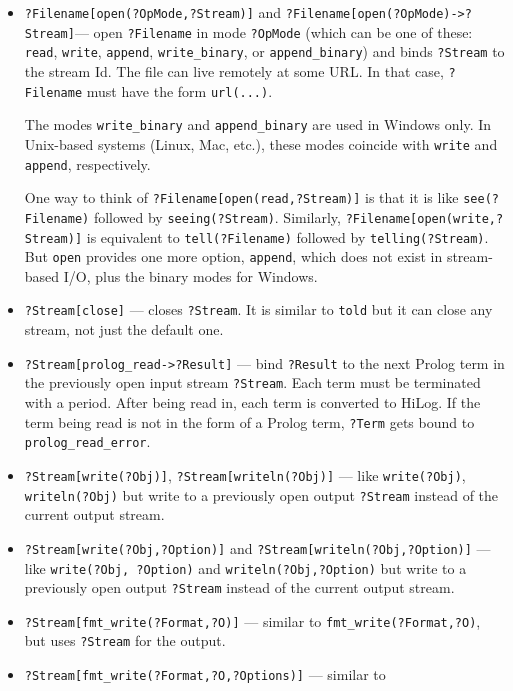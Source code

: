 \documentclass[11pt]{article}
\begin{document}
\begin{itemize}
\item  {\tt ?Filename[open(?OpMode,?Stream)]} and
  \texttt{?Filename[open(?OpMode)->?Stream]}--- open {\tt ?Filename} in mode
  {\tt ?OpMode} (which can be one of these: {\tt read}, {\tt write}, {\tt append},
  \texttt{write\_binary}, or \texttt{append\_binary}) and
  binds {\tt ?Stream} to the stream Id.
  The file can live remotely at some URL. In that case, {\tt ?Filename}
  must have the form {\tt url(...)}.  

  The modes \texttt{write\_binary} and \texttt{append\_binary} are used in
  Windows only. In Unix-based systems (Linux, Mac, etc.), these modes
  coincide with {\tt write} and {\tt append}, respectively.

  One way to think of 
  \texttt{?Filename[open(read,?Stream)]} is that it is
  like \texttt{see(?Filename)}
  followed by \texttt{seeing(?Stream)}. Similarly,
  \texttt{?Filename[open(write,?Stream)]} 
  is equivalent to \texttt{tell(?Filename)} followed by \texttt{telling(?Stream)}.
  But \texttt{open} provides one more option, \texttt{append}, which does not
  exist in stream-based I/O, plus the binary modes for Windows.
\item {\tt ?Stream[close]} --- closes {\tt ?Stream}. It is similar to
  \texttt{told} but it can close any stream, not just the default one. 
\item {\tt ?Stream[prolog\_read->?Result]} --- bind {\tt ?Result} to the
  next Prolog term
  in the previously open input stream {\tt ?Stream}. Each term must
  be terminated with a period.
  After being read in, each term is converted to HiLog.
  If the term being read
  is not in the form of a Prolog term, \texttt{?Term} gets bound to
  \texttt{prolog\_read\_error}.
\item {\tt ?Stream[write(?Obj)]}, \texttt{?Stream[writeln(?Obj)]} --- like 
  \texttt{write(?Obj)}, \texttt{writeln(?Obj)} but write to a
  previously open output {\tt ?Stream} instead of the current output
  stream.
\item {\tt ?Stream[write(?Obj,?Option)]} and \texttt{?Stream[writeln(?Obj,?Option)]} --- like 
  \texttt{write(?Obj, ?Option)} and \texttt{writeln(?Obj,?Option)} but write to a
  previously open output {\tt ?Stream} instead of the current output
  stream.
\item {\tt ?Stream[fmt\_write(?Format,?O)]} --- similar to
  \texttt{fmt\_write(?Format,?O)}, but uses {\tt ?Stream} for the
  output. 
\item {\tt ?Stream[fmt\_write(?Format,?O,?Options)]} --- similar to

\end{itemize}
\end{document}
